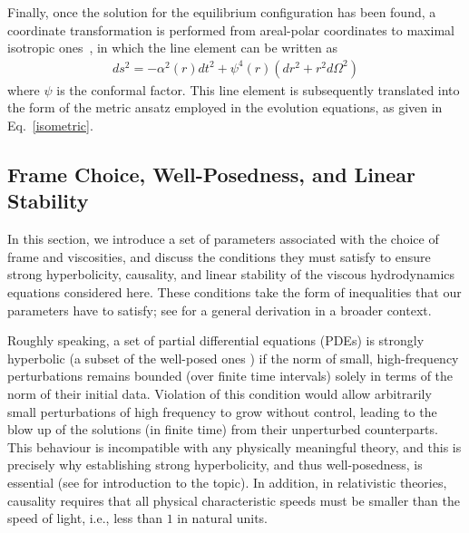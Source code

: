 \documentclass[prd,aps,twocolumn,floats,floatfix,nofootinbib,superscriptaddress] {revtex4-1}
\begin{document}
Finally, once the solution for the equilibrium configuration has been found, a coordinate transformation is performed from areal-polar coordinates to maximal isotropic ones~\cite{2004PhDT.......230L}, in which the line element can be written as
\begin{align}
    ds^2 = -\alpha^2(r)dt^2 + \psi^4(r)(dr^2 + r^2 d\Omega^2)
    \label{maximal_isotropic}
\end{align}
where $\psi$ is the conformal factor.  This line element is subsequently translated into the form of the metric ansatz employed in the evolution equations, as given in Eq.~\eqref{isometric}. 


\subsection{Frame Choice, Well-Posedness, and Linear Stability}\label{frame}

In this section, we introduce a set of parameters associated with the choice of frame and viscosities, and discuss the conditions they must satisfy to ensure strong hyperbolicity, causality, and linear stability of the viscous hydrodynamics equations considered here. These conditions take the form of inequalities that our parameters have to satisfy; see \cite{Bemfica:2019knx}  for a general derivation in a broader context.

Roughly speaking, a set of partial differential equations (PDEs) is strongly hyperbolic  (a subset of the well-posed ones ) if the norm of small, high-frequency perturbations remains bounded (over finite time intervals) solely in terms of the norm of their initial data. Violation of this condition would allow arbitrarily small perturbations of high frequency to grow without control, leading to the blow up of the solutions (in finite
time) from their unperturbed counterparts. This behaviour is incompatible with any physically meaningful theory, and this is precisely why establishing strong hyperbolicity, and thus well-posedness, is essential (see \cite{KreLor89, GusKreOli95, Sarbach:2012pr, Hil13} for introduction to the topic). In addition, in relativistic theories, causality requires that all physical characteristic speeds must be smaller than the speed of light, i.e., less than $1$ in natural units.
\end{document}
